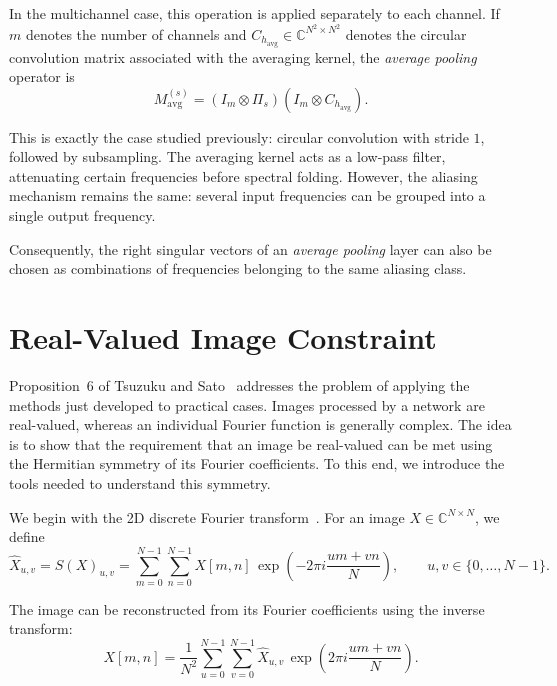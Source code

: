 In the multichannel case, this operation is applied separately to each channel. If $m$
denotes the number of channels and
$C_{h_{\mathrm{avg}}}\in\mathbb{C}^{N^2\times N^2}$ denotes the circular convolution matrix
associated with the averaging kernel, the \textit{average pooling} operator is
\begin{equation}
    M_{\mathrm{avg}}^{(s)}
    =
    (I_m \otimes \Pi_s)
    (I_m \otimes C_{h_{\mathrm{avg}}}).
    \label{eq:average_pooling_convolution_sampling}
\end{equation}

This is exactly the case studied previously: circular convolution with stride $1$,
followed by subsampling. The averaging kernel acts as a low-pass filter, attenuating
certain frequencies before spectral folding. However, the aliasing mechanism remains the same:
several input frequencies can be grouped into a single output frequency.

Consequently, the right singular vectors of an \textit{average pooling} layer can also
be chosen as combinations of frequencies belonging to the same aliasing class.

\section{Real-Valued Image Constraint}
\label{sec:contrainte-image-reelle}

Proposition~6 of Tsuzuku and Sato~\cite{tsuzuku2019structural} addresses the problem of applying
the methods just developed to practical cases. Images processed by a network are real-valued,
whereas an individual Fourier function is generally complex. The idea is to show that the requirement
that an image be real-valued can be met using the Hermitian symmetry of its Fourier coefficients. To this end, we
introduce the tools needed to understand this symmetry.

We begin with the 2D discrete Fourier transform~\cite{ImagerieNumeriqueTheme7Block2}. For an image
$X\in\mathbb{C}^{N\times N}$, we define
\begin{equation*}
    \widehat{X}_{u,v}
    =
    S(X)_{u,v}
    =
    \sum_{m=0}^{N-1}\sum_{n=0}^{N-1}
    X[m,n]\,
    \exp\left(
        -2\pi i\frac{um+vn}{N}
    \right),
    \qquad
    u,v\in\{0,\dots,N-1\}.
\end{equation*}

The image can be reconstructed from its Fourier coefficients using the inverse transform:
\begin{equation}
    X[m,n]
    =
    \frac{1}{N^2}
    \sum_{u=0}^{N-1}\sum_{v=0}^{N-1}
    \widehat{X}_{u,v}\,
    \exp\left(
        2\pi i\frac{um+vn}{N}
    \right).
    \label{eq:idft2d_definition}
\end{equation}


